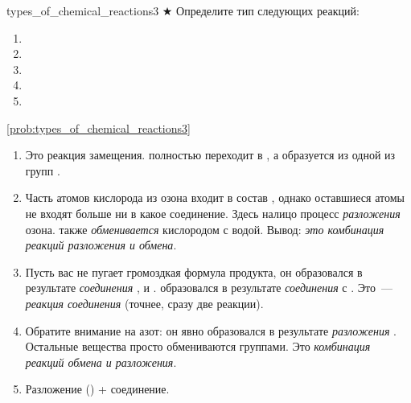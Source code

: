 \begin{problem}{}{types_of_chemical_reactions3}
    $\bigstar$ Определите тип следующих реакций:
    \begin{enumerate}[label=\arabic*)]
        \item {}
        \item {}
        \item {}
        \item {}
        \item {}
    \end{enumerate}
    \begin{sol}{\ref{prob:types_of_chemical_reactions3}}
        \begin{enumerate}[label=\arabic*)]
            \item Это реакция замещения.  полностью переходит в , а  образуется из одной из групп .
            \item Часть атомов кислорода из озона входит в состав , однако оставшиеся атомы не входят больше ни в какое соединение. Здесь налицо процесс \emph{разложения} озона.  также \emph{обменивается} кислородом с водой. Вывод: \emph{это комбинация реакций разложения и обмена}.
            \item Пусть вас не пугает громоздкая формула продукта, он образовался в результате \emph{соединения} ,  и .  образовался в результате \emph{соединения}  с . Это~--- \emph{реакция соединения} (точнее, сразу две реакции).
            \item Обратите внимание на азот: он явно образовался в результате \emph{разложения} . Остальные вещества просто обмениваются группами. Это \emph{комбинация реакций обмена и разложения}.
            \item Разложение () + соединение.
        \end{enumerate}
    \end{sol}
\end{problem}